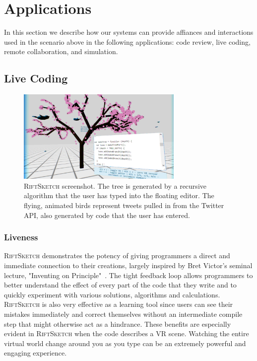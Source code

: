 \documentclass[conference]{IEEEtran}
\begin{document}
\section{Applications}

In this section we describe how our systems can provide affiances and interactions used in the scenario above in the following applications:
code review, live coding, remote collaboration, and simulation. 


\subsection{Live Coding}

\begin{figure}[ht!]
\centering
\includegraphics[width=80mm]{figures/riftsketch/closer}
\caption{\textsc{RiftSketch} screenshot. The tree is generated by a recursive algorithm that the user has typed into the floating editor. The flying, animated birds represent tweets pulled in from the Twitter API, also generated by code that the user has entered. \label{RiftSketch}}
\end{figure}

\subsubsection{Liveness}

\textsc{RiftSketch} demonstrates the potency of giving programmers a direct and immediate connection to their creations, largely inspired by Bret Victor's seminal lecture, "Inventing on Principle"~\cite{Victor:InventingOnPrincipleVideo}\cite{Victor:InventingOnPrincipleTranscript}.
The tight feedback loop allows programmers to better understand the effect of every part of the code that they write and to quickly experiment with various solutions, algorithms and calculations. 
\textsc{RiftSketch} is also very effective as a learning tool since users can see their mistakes immediately and correct themselves without an intermediate compile step that might otherwise act as a hindrance.  
These benefits are especially evident in \textsc{RiftSketch} when the code describes a VR scene. 
Watching the entire virtual world change around you as you type can be an extremely powerful and engaging experience.
\end{document}
